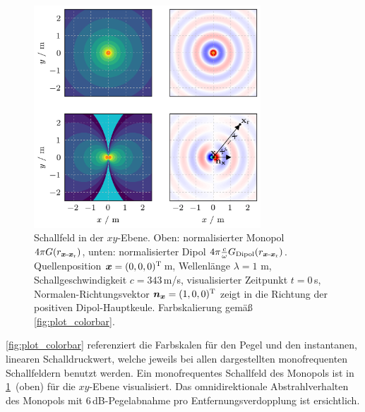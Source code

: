 \begin{figure}[t]
\centering
\begin{plotfigures}
\includegraphics[width=85mm]{../python/monopole_dipole.png}
\end{plotfigures}
\caption{Schallfeld in der $xy$-Ebene.
Oben: normalisierter Monopol $4 \pi G(r_{\bm{x}\text{-}\bm{x}_\mathrm{r}})$,
unten: normalisierter Dipol $4 \pi \frac{c}{\omega} G_\text{Dipol}(r_{\bm{x}\text{-}\bm{x}_\mathrm{r}})$.
Quellenposition $\bm{x}=(0,0,0)^\mathrm{T}$\,m,
Wellenlänge $\lambda=1$ m, Schallgeschwindigkeit $c=343$\,m/s, visualisierter
Zeitpunkt $t=0$\,s,
%
Normalen-Richtungsvektor $\bm{n}_{\bm{x}}=(1,0,0)^\mathrm{T}$ zeigt in die Richtung der
positiven Dipol-Hauptkeule.
Farbskalierung gemäß \Abb\ref{fig:plot_colorbar}.
\cc
}
\label{fig:monopole_dipole}
\end{figure}



\Abb\ref{fig:plot_colorbar} referenziert die Farbskalen für den Pegel und
den instantanen, linearen Schalldruckwert,
welche jeweils bei allen dargestellten monofrequenten Schallfeldern benutzt
werden.
%
Ein monofrequentes Schallfeld des Monopols ist in
\Abb\ref{fig:monopole_dipole}~(oben) für die $xy$-Ebene visualisiert.
%
Das omnidirektionale Abstrahlverhalten des Monopols mit $6$\,dB-Pegelabnahme pro
Entfernungsverdopplung ist ersichtlich.

